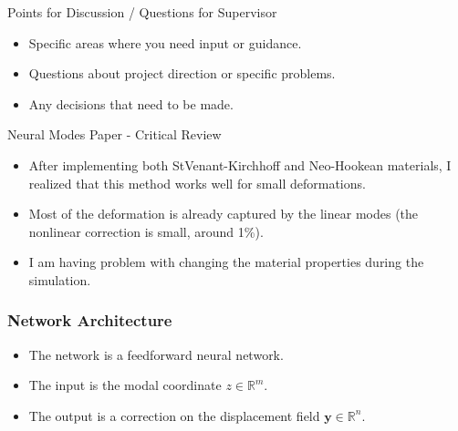 \documentclass{beamer}
\begin{document}
\begin{frame}{Points for Discussion / Questions for Supervisor}
    \begin{itemize}
        \item Specific areas where you need input or guidance.
        \item Questions about project direction or specific problems.
        \item Any decisions that need to be made.
    \end{itemize}
\end{frame}



\begin{frame}{Neural Modes Paper - Critical Review}
    \begin{itemize}
        \item After implementing both StVenant-Kirchhoff and Neo-Hookean materials, I realized that this method works well for small deformations.
        \item Most of the deformation is already captured by the linear modes (the nonlinear correction is small, around 1\%).
        \item I am having problem with changing the material properties during the simulation.
    \end{itemize}
\end{frame}


\begin{frame}
    \frametitle{Network Architecture}
    \begin{itemize}
        \item The network is a feedforward neural network.
        \item The input is the modal coordinate \( z \in \mathbb{R}^m \).
        \item The output is a correction on the displacement field \( \mathbf{y} \in \mathbb{R}^n \).
    \end{itemize}



\begin{center}
        
\end{center}
    
\end{frame}
\end{document}
